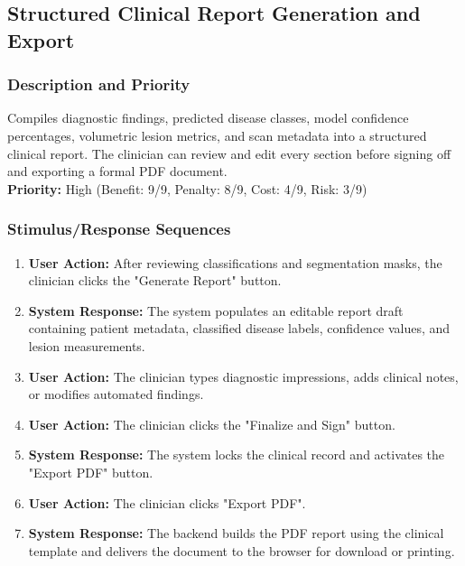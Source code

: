 \documentclass[12pt,a4paper]{report}
\begin{document}
\subsection{Structured Clinical Report Generation and Export}
\subsubsection{Description and Priority}
Compiles diagnostic findings, predicted disease classes, model confidence percentages, volumetric lesion metrics, and scan metadata into a structured clinical report. The clinician can review and edit every section before signing off and exporting a formal PDF document.\\
\textbf{Priority:} High (Benefit: 9/9, Penalty: 8/9, Cost: 4/9, Risk: 3/9)

\subsubsection{Stimulus/Response Sequences}
\begin{enumerate}
    \item \textbf{User Action:} After reviewing classifications and segmentation masks, the clinician clicks the "Generate Report" button.
    \item \textbf{System Response:} The system populates an editable report draft containing patient metadata, classified disease labels, confidence values, and lesion measurements.
    \item \textbf{User Action:} The clinician types diagnostic impressions, adds clinical notes, or modifies automated findings.
    \item \textbf{User Action:} The clinician clicks the "Finalize and Sign" button.
    \item \textbf{System Response:} The system locks the clinical record and activates the "Export PDF" button.
    \item \textbf{User Action:} The clinician clicks "Export PDF".
    \item \textbf{System Response:} The backend builds the PDF report using the clinical template and delivers the document to the browser for download or printing.
\end{enumerate}
\end{document}
